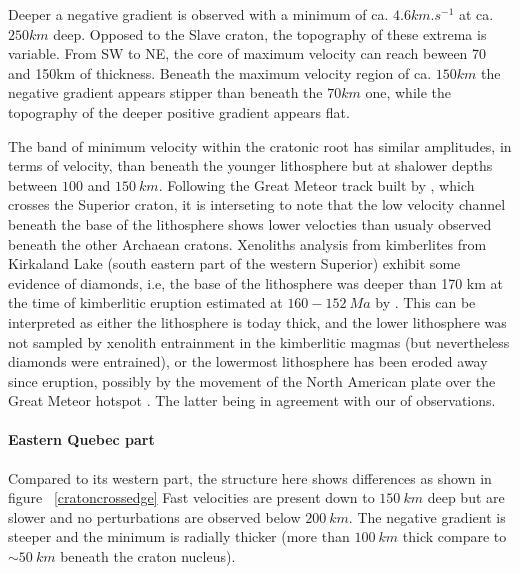 \documentclass[12pt]{article}
\begin{document}
			Deeper a negative gradient is observed with a minimum of ca. $4.6km.s^{-1}$ at ca. $250km$ deep. 
			Opposed to the Slave craton, the topography of these extrema is variable. 
			From SW to NE, the core of maximum velocity can reach beween 70 and 150km of thickness. 
			Beneath the maximum velocity region of ca. $150km$ the negative gradient appears stipper than beneath the $70km$ one, while the topography of the deeper positive gradient appears flat. 
			 
			The band of minimum velocity within the cratonic root has similar amplitudes, in terms of velocity, than beneath the younger lithosphere but at shalower depths between $100$ and $150 \: km$. 
			Following the Great Meteor track built by \cite{heaman2000timing}, which crosses the Superior craton, it is interseting to note that the low velocity channel beneath the base of the lithosphere shows lower velocties than usualy observed beneath the other Archaean cratons. 
			Xenoliths analysis from kimberlites from Kirkaland Lake (south eastern part of the western Superior) exhibit some evidence of diamonds, i.e, the base of the lithosphere was deeper than 170 km at the time of kimberlitic eruption \citep{jones2014electrical} estimated at $160 - 152 \: Ma$ by \cite{heaman2000timing,heaman2003timing}. 
			This can be interpreted as either the lithosphere is today thick, and the lower lithosphere was not sampled by xenolith entrainment in the kimberlitic magmas (but nevertheless diamonds were entrained), or the lowermost lithosphere has been eroded away since eruption, possibly by the movement of the North American plate over the Great Meteor hotspot \citep{heaman2000timing,jones2014electrical}. The latter being in agreement with our of observations. 


		\paragraph{Eastern Quebec part}
			Compared to its western part, the structure here shows differences as shown in figure ~\ref{cratoncrossedge} 
			Fast velocities are present down to $150 \: km$ deep but are slower and no perturbations are observed below $200 \: km$. 
			The negative gradient is steeper and the minimum is radially thicker (more than $100 \: km$ thick compare to $\sim 50 \: km$ beneath the craton nucleus). 
\end{document}
